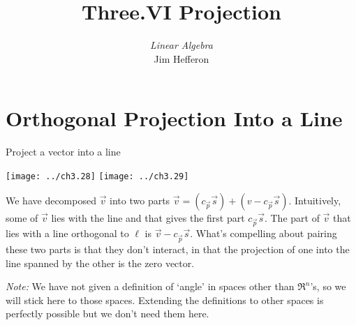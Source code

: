 \documentclass[10pt,t]{beamer}
\title[Projection] %
{Three.VI Projection}
\author{\textit{Linear Algebra} \\ {\small Jim Hef{}feron}}
\institute{
  \texttt{http://joshua.smcvt.edu/linearalgebra}
}
\date{}
\begin{document}
\begin{frame}
  \titlepage
\end{frame}




\section{Orthogonal Projection Into a Line}
\begin{frame}{Project a vector into a line}
\begin{center}
  \texttt{[image: ../ch3.28]}
  \hspace*{0.6in}
  \texttt{[image: ../ch3.29]}      
\end{center}
\pause
{}

\pause
{}
\end{frame}




\begin{frame}
We have decomposed $\vec{v}$ into two parts
$\vec{v}=(c_{\vec{p}}\vec{s})+(v-c_{\vec{p}}\vec{s})$.
Intuitively, some of $\vec{v}$ lies with the line and that gives
the first part $c_{\vec{p}}\vec{s}$.
The part of $\vec{v}$ that lies with a line orthogonal to $\ell$
is $\vec{v}-c_{\vec{p}}\vec{s}$.
What's compelling about pairing these two parts 
is that they don't interact, in that the projection of one into the line
spanned by the other is the zero vector.

\pause\bigskip\noindent\textit{Note:} 
We have not given a 
definition of `angle' in spaces
other than $\Re^n$'s,
so we will stick here to those spaces.
Extending the definitions to other spaces is perfectly possible but
we don't need them here.
\end{frame}
\end{document}
